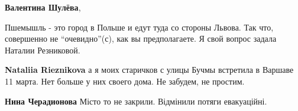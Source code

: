 \begin{itemize}
\begin{itemize}
\textbf{Валентина Шулёва}, 

Пшемышль - это город в Польше и едут туда со стороны Львова. Так что, совершенно
не \enquote{очевидно}(с), как вы предполагаете. Я свой вопрос задала Наталии
Резниковой.

\textbf{Nataliia Rieznikova} а я моих старичков с улицы Бучмы встретила в Варшаве 11 марта. Нет больше у них своего дома. Не забудем, не простим.

\textbf{Нина Черадионова} Місто то не закрили. Відмінили потяги евакуаційні.
\end{itemize} %

\end{itemize} %
